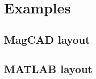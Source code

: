 \documentclass[a4paper,10pt]{article}
\begin{document}
\section{Examples}
\subsection{MagCAD layout}


\subsection{MATLAB layout}

\end{document}
